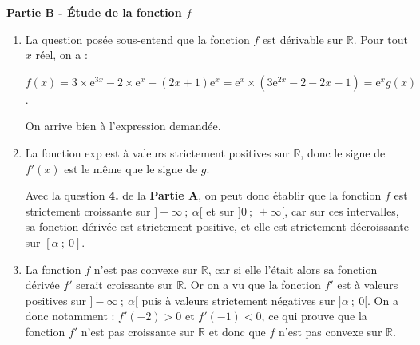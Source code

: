 \documentclass[10pt]{article}
\providecommand{\R}{\mathbb{R}}
\providecommand{\e}{{\mathrm{e}}}
\begin{document}
\textbf{Partie B - Étude de la fonction $f$}

\medskip

\begin{enumerate}
	\item La question posée sous-entend que la fonction $f$ est dérivable sur $\R$. Pour tout $x$ réel, on a :

$f(x) = 3\times \e^{3x} - 2\times \e^x - \left(2x + 1\right)\e^{x} = \e^{x} \times (3\e^{2x} - 2 - 2x-1) = \e^{x}g(x)$.

On arrive bien à l'expression demandée.

	\item La fonction exp est à valeurs strictement positives sur $\R$, donc le signe de $f'(x)$ est le même que le signe de $g$.

Avec la question \textbf{4.} de la \textbf{Partie A}, on peut donc établir que la fonction $f$ est strictement croissante sur $]-\infty~;~\alpha[$ et sur $]0~;~+\infty[$, car sur ces intervalles, sa fonction dérivée est strictement positive, et elle est strictement décroissante sur $[\alpha~;~0]$.

	\item La fonction $f$ n'est pas convexe sur $\mathbb{R}$, car si elle l'était alors sa fonction dérivée $f'$ serait croissante sur $\R$. Or on a vu que la fonction $f'$ est à valeurs positives sur $]-\infty~;~\alpha[$ puis à valeurs strictement négatives sur $]\alpha~;~0[$. On a donc notamment : $f'(-2)>0$ et $f'(-1)< 0$, ce qui prouve que la fonction $f'$ n'est pas croissante sur $\R$ et donc que $f$ n'est pas convexe sur $\R$.
\end{enumerate}

\bigskip
\end{document}
